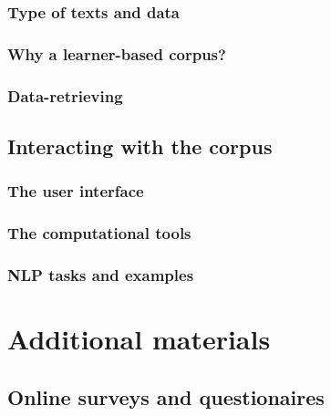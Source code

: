 \documentclass[
  a4paper,
  twoside,
  12pt,
  chapterprefix=false,
  bibliography=totocnumbered,
  listof=flat]{scrbook}
\begin{document}
\hypertarget{type-of-texts-and-data}{%
\subsubsection{Type of texts and data}\label{type-of-texts-and-data}}

\hypertarget{why-a-learner-based-corpus}{%
\subsubsection{Why a learner-based corpus?}\label{why-a-learner-based-corpus}}

\hypertarget{data-retrieving}{%
\subsubsection{Data-retrieving}\label{data-retrieving}}

\hypertarget{interacting-with-the-corpus}{%
\subsection{Interacting with the corpus}\label{interacting-with-the-corpus}}

\hypertarget{the-user-interface}{%
\subsubsection{The user interface}\label{the-user-interface}}

\hypertarget{the-computational-tools}{%
\subsubsection{The computational tools}\label{the-computational-tools}}

\hypertarget{nlp-tasks-and-examples}{%
\subsubsection{NLP tasks and examples}\label{nlp-tasks-and-examples}}

\hypertarget{additional-materials}{%
\section{Additional materials}\label{additional-materials}}

\hypertarget{online-surveys-and-questionaires}{%
\subsection{Online surveys and questionaires}\label{online-surveys-and-questionaires}}
\end{document}
